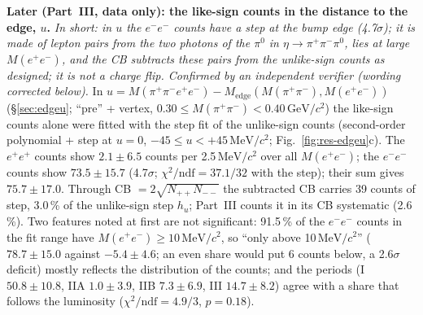 \documentclass[11pt,a4paper]{article}
\newcommand{\piz}{\ensuremath{\pi^{0}}\xspace}
\newcommand{\pipi}{\ensuremath{\pi^{+}\pi^{-}}\xspace}
\newcommand{\Mfour}{\ensuremath{M(\pi^{+}\pi^{-}e^{+}e^{-})}\xspace}
\newcommand{\Mee}{\ensuremath{M(e^{+}e^{-})}\xspace}
\newcommand{\Mpipi}{\ensuremath{M(\pi^{+}\pi^{-})}\xspace}
\newcommand{\GeVcc}{\ensuremath{\mathrm{GeV}/c^{2}}\xspace}
\newcommand{\MeVcc}{\ensuremath{\mathrm{MeV}/c^{2}}\xspace}
\newcommand{\Medge}{\ensuremath{M_{\mathrm{edge}}}}%
\begin{document}
\textbf{Later (Part~III, data only): the like-sign counts in the distance to the edge, $u$.} \emph{In short: in $u$ the $e^-e^-$ counts have a
step at the bump edge (4.7$\sigma$); it is made of lepton pairs from the two photons of the \piz in $\eta\to\pipi\piz$, lies at large \Mee, and
the CB subtracts these pairs from the unlike-sign counts as designed; it is not a charge flip. Confirmed by an independent verifier (wording corrected below).}
In $u=\Mfour-\Medge(\Mpipi,\Mee)$ (\S\ref{sec:edgeu}; ``pre'' + vertex, $0.30\le\Mpipi<0.40$\,\GeVcc) the like-sign counts alone were fitted with
the step fit of the unlike-sign counts (second-order polynomial + step at $u=0$, $-45\le u<+45$\,\MeVcc; Fig.~\ref{fig:res-edgeu}c). The
$e^+e^+$ counts show $2.1\pm6.5$ counts per 2.5\,\MeVcc over all \Mee; the $e^-e^-$ counts show $73.5\pm15.7$ (4.7$\sigma$; $\chi^2/\mathrm{ndf}=37.1/32$
with the step); their sum gives $75.7\pm17.0$. Through CB $=2\sqrt{N_{++}N_{--}}$ the subtracted CB carries 39 counts of step, 3.0\,\% of the
unlike-sign step $h_u$; Part~III counts it in its CB systematic (2.6\,\%). Two features noted at first are not significant: 91.5\,\% of the
$e^-e^-$ counts in the fit range have $\Mee\ge10$\,\MeVcc, so ``only above 10\,\MeVcc'' ($78.7\pm15.0$ against $-5.4\pm4.6$; an even share would
put 6 counts below, a 2.6$\sigma$ deficit) mostly reflects the distribution of the counts; and the periods (I $50.8\pm10.8$, IIA $1.0\pm3.9$, IIB
$7.3\pm6.9$, III $14.7\pm8.2$) agree with a share that follows the luminosity ($\chi^2/\mathrm{ndf}=4.9/3$, $p=0.18$).
\end{document}
